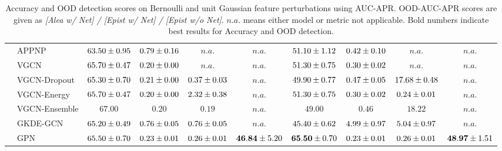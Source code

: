 \begin{table*}[!h]
{\begin{tabular}{ll|cccc|cccc}
        \midrule
        
        & APPNP & ${63.50\tiny \pm 0.95}$ & ${{0.79}\tiny \pm 0.16}$ & $n.a.$ & $n.a.$ & ${51.10\tiny \pm 1.12}$ & ${0.42\tiny \pm 0.10}$ & $n.a.$ & $n.a.$\\
        & VGCN & ${65.70\tiny \pm 0.47}$ & ${0.20\tiny \pm 0.00}$ & $n.a.$ & $n.a.$ & ${51.30\tiny \pm 0.75}$ & ${0.30\tiny \pm 0.02}$ & $n.a.$ & $n.a.$\\
        & VGCN-Dropout & ${65.30\tiny \pm 0.70}$ & ${0.21\tiny \pm 0.00}$ & ${0.37\tiny \pm 0.03}$ & $n.a.$ & ${49.90\tiny \pm 0.77}$ & ${0.47\tiny \pm 0.05}$ & ${17.68\tiny \pm 0.48}$ & $n.a.$\\
        & VGCN-Energy & ${65.70\tiny \pm 0.47}$ & ${0.20\tiny \pm 0.00}$ & ${{2.32}\tiny \pm 0.38}$ & $n.a.$ & ${51.30\tiny \pm 0.75}$ & ${0.30\tiny \pm 0.02}$ & ${0.24\tiny \pm 0.01}$ & $n.a.$\\
        & VGCN-Ensemble & ${\mathbf{67.00}}$ & ${0.20}$ & ${0.19}$ & $n.a.$ & ${49.00}$ & ${0.46}$ & ${{18.22}}$ & $n.a.$\\
        & GKDE-GCN & ${65.20\tiny \pm 0.49}$ & ${0.76\tiny \pm 0.05}$ & ${0.76\tiny \pm 0.05}$ & $n.a.$ & ${45.40\tiny \pm 0.62}$ & ${{4.99}\tiny \pm 0.97}$ & ${5.04\tiny \pm 0.97}$ & $n.a.$\\
        & GPN & ${65.50\tiny \pm 0.70}$ & ${0.23\tiny \pm 0.01}$ & ${0.26\tiny \pm 0.01}$ & ${\mathbf{46.84}\tiny \pm 5.20}$ & ${\mathbf{65.50}\tiny \pm 0.70}$ & ${0.23\tiny \pm 0.01}$ & ${0.26\tiny \pm 0.01}$ & ${\mathbf{48.97}\tiny \pm 1.51}$\\

        \bottomrule
    \end{tabular}}
    \caption{Accuracy and OOD detection scores on Bernoulli and unit Gaussian feature perturbations using AUC-APR. OOD-AUC-APR scores are given as \emph{[Alea w/ Net] / [Epist w/ Net] / [Epist w/o Net]}. $n.a.$ means either model or metric not applicable. Bold numbers indicate best results for Accuracy and  OOD detection.}
    \label{tab:isolated_apr}
\end{table*}